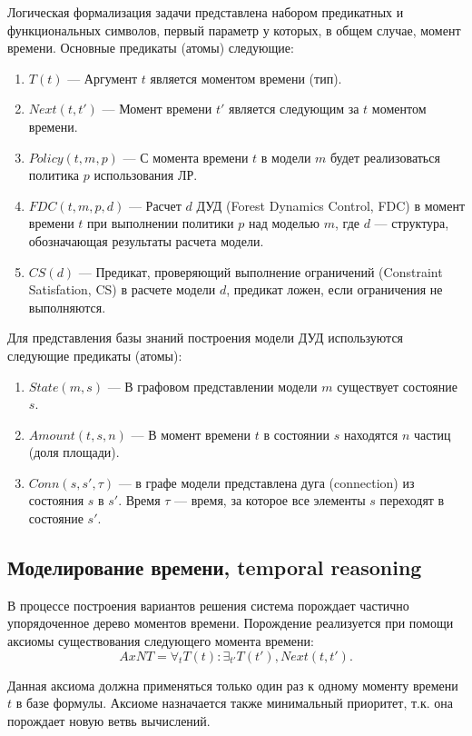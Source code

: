 Логическая формализация задачи представлена набором предикатных и функциональных символов, первый параметр у которых, в общем случае, момент времени. Основные предикаты (атомы) следующие:
\begin{enumerate}
\item{$T(t)$} --- Аргумент $t$ является моментом времени (тип).
\item{$Next(t,t')$} --- Момент времени $t'$ является следующим за $t$ моментом времени.
\item{$Policy(t,m,p)$} --- С момента времени $t$ в модели $m$ будет реализоваться политика $p$ использования ЛР.
\item{$FDC(t,m,p,d)$} --- Расчет $d$ ДУД (Forest Dynamics Control, FDC) в момент времени $t$ при выполнении политики $p$ над моделью $m$, где $d$ --- структура, обозначающая результаты расчета модели.
\item{$CS(d)$} --- Предикат, проверяющий выполнение ограничений (Constraint Satisfation, CS) в расчете модели $d$, предикат ложен, если ограничения не выполняются.
\end{enumerate}

Для представления базы знаний построения модели ДУД используются следующие предикаты (атомы):
\begin{enumerate}
\item{$State(m, s)$} --- В графовом представлении модели $m$ существует состояние $s$.
\item{$Amount(t, s, n)$} --- В момент времени $t$ в состоянии $s$ находятся $n$ частиц (доля площади).
\item{$Conn(s, s', \tau{})$} --- в графе модели представлена дуга (connection) из состояния $s$ в $s'$. Время $\tau{}$ --- время, за которое все элементы $s$ переходят в состояние $s'$.
\end{enumerate}

\subsection{Моделирование времени, temporal reasoning}
В процессе построения вариантов решения система порождает частично упорядоченное дерево моментов времени. Порождение реализуется при помощи аксиомы существования следующего момента времени:
$$
AxNT = \forall_{t} T(t)\colon \exists_{t'} T(t'),Next(t,t').
$$

Данная аксиома должна применяться только один раз к одному моменту времени $t$ в базе формулы. Аксиоме назначается также минимальный приоритет, т.к. она порождает новую ветвь вычислений.

